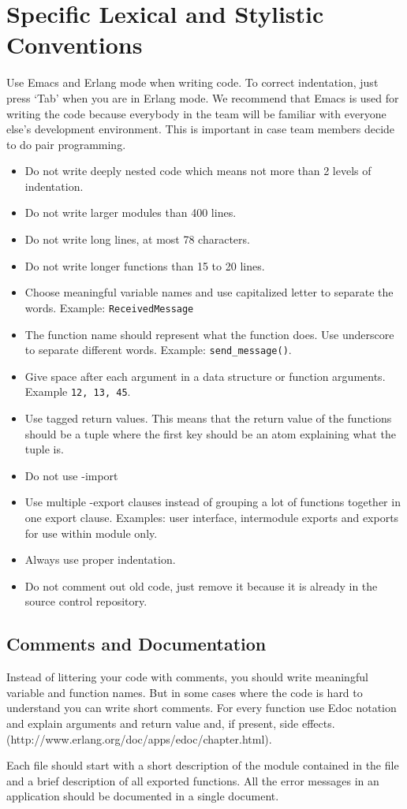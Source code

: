 \section{Specific Lexical and Stylistic Conventions}
Use Emacs and Erlang mode when writing code. To correct indentation, just press ‘Tab’ when you are in Erlang mode. We recommend that Emacs is used for writing the code because everybody in the team will be familiar with everyone else’s development environment. This is important in case team members decide to do pair programming.

\begin{itemize}

\item Do not write deeply nested code which means not more than 2 levels of indentation. 
\item Do not write larger modules than 400 lines. 
\item Do not write long lines, at most 78 characters.
\item Do not write longer functions than 15 to 20 lines. 
\item Choose meaningful variable names and use capitalized letter to separate the words. Example: \texttt{ReceivedMessage}
\item The function name should represent what the function does. Use underscore to separate different words. Example: \texttt{send\_message()}.
\item Give space after each argument in a data structure or function arguments. Example \texttt{{12, 13, 45}}.
\item Use tagged return values. This means that the return value of the functions should be a tuple where the first key should be an atom explaining what the tuple is.
\item Do not use -import
\item Use multiple -export clauses instead of grouping a lot of functions together in one export clause. Examples: user interface, intermodule exports and exports for use within module only. 
\item Always use proper indentation.
\item Do not comment out old code, just remove it because it is already in the source control repository.  
\end{itemize}

\subsection{Comments and Documentation}
Instead of littering your code with comments, you should write meaningful variable and function names. But in some cases where the code is hard to understand you can write short comments. For every function use Edoc notation and explain arguments and return value and, if present, side effects. (http://www.erlang.org/doc/apps/edoc/chapter.html).  

Each file should start with a short description of the module contained in the file and a brief description of all exported functions. All the error messages in an application should be documented in a single document.  





